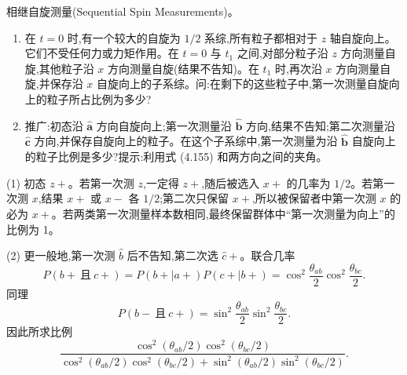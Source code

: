 \begin{question}
相继自旋测量(Sequential Spin Measurements)。
\begin{enumerate}
\item 在 $t=0$ 时,有一个较大的自旋为 $1/2$ 系综,所有粒子都相对于 $z$ 轴自旋向上。它们不受任何力或力矩作用。在 $t=0$ 与 $t_1$ 之间,对部分粒子沿 $z$ 方向测量自旋,其他粒子沿 $x$ 方向测量自旋(结果不告知)。在 $t_1$ 时,再次沿 $x$ 方向测量自旋,并保存沿 $x$ 自旋向上的子系综。问:在剩下的这些粒子中,第一次测量自旋向上的粒子所占比例为多少?
\item 推广:初态沿 $\hat{\mathbf a}$ 方向自旋向上;第一次测量沿 $\hat{\mathbf b}$ 方向,结果不告知;第二次测量沿 $\hat{\mathbf c}$ 方向,并保存自旋向上的粒子。在这个子系综中,第一次测量为沿 $\hat{\mathbf b}$ 自旋向上的粒子比例是多少?提示:利用式 (4.155) 和两方向之间的夹角。
\end{enumerate}

\par\smallskip
{}

\end{question}
\begin{solution}

(1) 初态 $z+$。若第一次测 $z$,一定得 $z+$,随后被选入 $x+$ 的几率为 $1/2$。若第一次测 $x$,结果 $x+$ 或 $x-$ 各 $1/2$;第二次只保留 $x+$,所以被保留者中第一次测 $x$ 的必为 $x+$。若两类第一次测量样本数相同,最终保留群体中“第一次测量为向上”的比例为 1。

(2) 更一般地,第一次测 $\hat b$ 后不告知,第二次选 $\hat c+$。联合几率
\[
P(b+\ \text{且}\ c+)=P(b+|a+)P(c+|b+)
=\cos^2\frac{\theta_{ab}}2\cos^2\frac{\theta_{bc}}2.
\]
同理
\[
P(b-\ \text{且}\ c+)=\sin^2\frac{\theta_{ab}}2\sin^2\frac{\theta_{bc}}2.
\]
因此所求比例
\[
\frac{\cos^2(\theta_{ab}/2)\cos^2(\theta_{bc}/2)}{\cos^2(\theta_{ab}/2)\cos^2(\theta_{bc}/2)+\sin^2(\theta_{ab}/2)\sin^2(\theta_{bc}/2)}.
\]

\end{solution}

